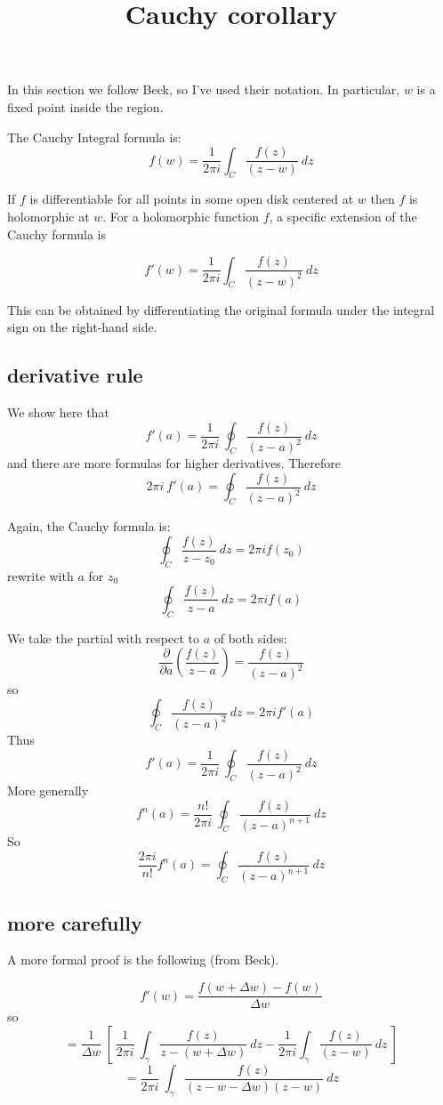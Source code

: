 \documentclass[11pt, oneside]{article}
\title{Cauchy corollary}
\date{}
\begin{document}
\maketitle
\Large


In this section we follow Beck, so I've used their notation.  In particular, $w$ is a fixed point inside the region.

The Cauchy Integral formula is:
\[ f(w) = \frac{1}{2 \pi i} \int_C \frac{f(z)}{(z - w)} \ dz \]

If $f$ is differentiable for all points in some open disk centered at $w$ then $f$ is holomorphic at $w$.  For a holomorphic function $f$, a specific extension of the Cauchy formula is

\[ f'(w) = \frac{1}{2 \pi i} \int_C \frac{f(z)}{(z - w)^2} \ dz \]

This can be obtained by differentiating the original formula under the integral sign on the right-hand side. 

\subsection*{derivative rule}

We show here that
\[ f'(a) = \frac{1}{2 \pi i} \ \oint_C \frac{f(z)}{(z-a)^2} \ dz \]
and there are more formulas for higher derivatives.
Therefore
\[ 2 \pi i \ f'(a) =  \oint_C \frac{f(z)}{(z-a)^2} \ dz \]

Again, the Cauchy formula is:
\[ \oint_C \frac{f(z)}{z-z_0} \ dz = 2 \pi i f(z_0) \]
rewrite with $a$ for $z_0$
\[ \oint_C \frac{f(z)}{z-a} \ dz = 2 \pi i f(a) \]

We take the partial with respect to $a$ of both sides:
\[ \frac{\partial}{\partial a} ( \frac{f(z)}{z-a} ) = \frac{f(z)}{(z-a)^2} \]
so
\[ \oint_C \frac{f(z)}{(z-a)^2} \ dz = 2 \pi i f'(a) \]
Thus
\[ f'(a) = \frac{1}{2 \pi i} \ \oint_C \frac{f(z)}{(z-a)^2} \ dz \]
More generally
\[ f^n(a) = \frac{n!}{2 \pi i} \ \oint_C \frac{f(z)}{(z-a)^{n+1}} \ dz \]
So
\[ \frac{2 \pi i}{n!} f^n(a) = \oint_C \frac{f(z)}{(z-a)^{n+1}} \ dz \]

\subsection*{more carefully} 

A more formal proof is the following (from Beck).

\[ f'(w) = \frac{f(w + \Delta w) - f(w)}{\Delta w} \]
so
\[ = \frac{1}{\Delta w} \ [ \ \frac{1}{2 \pi i} \ \int_{\gamma} \frac{f(z)}{z - (w + \Delta w)} \ dz - \frac{1}{2 \pi i} \int_{\gamma} \frac{f(z)}{(z - w)} \ dz \ ] \]
\[ =  \frac{1}{2 \pi i} \ \int_{\gamma} \frac{f(z)}{(z - w - \Delta w)(z-w)} \ dz  \]
\end{document}
